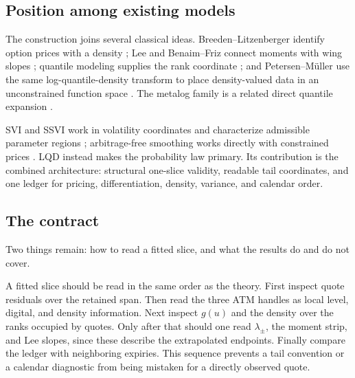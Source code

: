 \subsection{Position among existing models}

The construction joins several classical ideas.  Breeden--Litzenberger
identify option prices with a density \citep{BreedenLitzenberger1978}; Lee and
Benaim--Friz connect moments with wing slopes
\citep{Lee2004,BenaimFriz2009}; quantile modeling supplies the rank coordinate
\citep{Parzen1979,Gilchrist2000}; and Petersen--M\"uller use the same
log-quantile-density transform to place density-valued data in an
unconstrained function space \citep{PetersenMuller2016}.  The metalog family
is a related direct quantile expansion \citep{Keelin2016}.

SVI and SSVI work in volatility coordinates and characterize admissible
parameter regions \citep{Gatheral2004,GatheralJacquier2014}; arbitrage-free
smoothing works directly with constrained prices \citep{Fengler2009}.  LQD
instead makes the probability law primary.  Its contribution is the combined
architecture: structural one-slice validity, readable tail coordinates, and
one ledger for pricing, differentiation, density, variance, and calendar
order.

\subsection{The contract}
\label{sec:limits}

Two things remain: how to read a fitted slice, and what the results do
and do not cover.

A fitted slice should be read in the same order as the theory.  First inspect quote residuals over the retained span.  Then read the
three ATM handles as local level, digital, and density information.  Next
inspect $g(u)$ and the density over the ranks occupied by quotes.  Only after
that should one read $\lambda_\pm$, the moment strip, and Lee slopes, since
these describe the extrapolated endpoints.  Finally compare the ledger with
neighboring expiries.  This sequence prevents a tail convention or a
calendar diagnostic from being mistaken for a directly observed quote.

